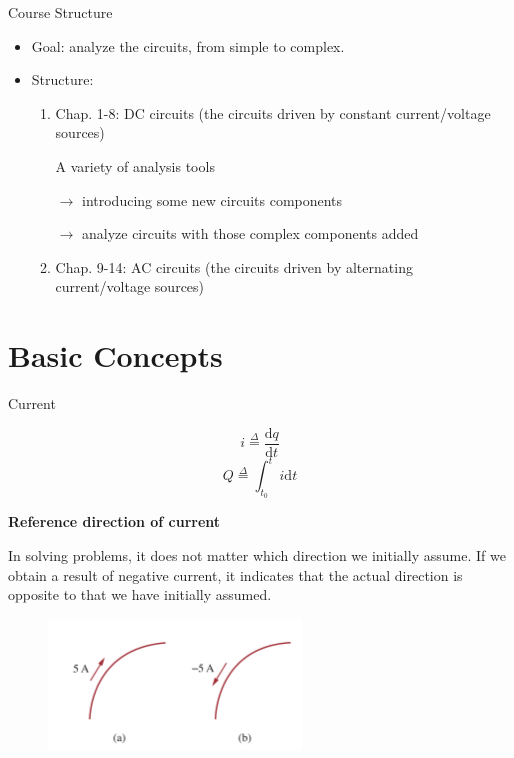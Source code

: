 \documentclass{beamer}
\begin{document}
\begin{frame}{Course Structure}
    \begin{itemize}
        \item Goal: analyze the circuits, from simple to complex.
        \item Structure:

        \begin{enumerate}
            \item Chap. 1-8: DC circuits (the circuits driven by constant current/voltage sources)

            A variety of analysis tools 
            
            $\rightarrow$ introducing some new circuits components 
            
            $\rightarrow$ analyze circuits with those complex components added
            
            \item Chap. 9-14: AC circuits (the circuits driven by alternating current/voltage sources)
        \end{enumerate}
        

    \end{itemize}
    
\end{frame}


\section{Basic Concepts}

\begin{frame}{Current}

$$i \overset{\Delta}{=} \dfrac{\mathrm{d}q}{\mathrm{d}t}$$
$$Q \overset{\Delta}{=} \int_{t_{0}}^{t}i \mathrm{d}t $$

\textbf{Reference direction of current}

In solving problems, it does not matter which direction we initially assume. If we obtain a result of negative current, it indicates that the actual direction is opposite to that we have initially assumed.

\begin{figure}
\centering
\includegraphics[width=0.6\textwidth]{current2.png}
\end{figure}

\end{frame}
\end{document}
